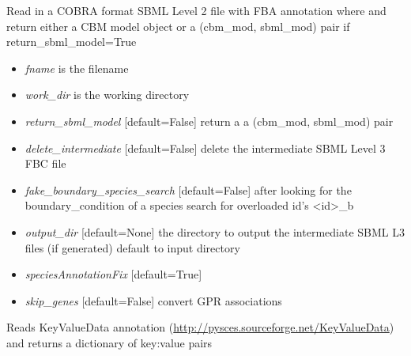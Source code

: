 \documentclass[a4paper,11pt,english]{sphinxmanual}
\begin{document}

\begin{fulllineitems}
\label{modules_doc:cbmpy.CBXML.sbml_readCOBRASBML}
Read in a COBRA format SBML Level 2 file with FBA annotation where and return either a CBM model object
or a (cbm\_mod, sbml\_mod) pair if return\_sbml\_model=True
\begin{itemize}
\item {} 
\emph{fname} is the filename

\item {} 
\emph{work\_dir} is the working directory

\item {} 
\emph{return\_sbml\_model} {[}default=False{]} return a a (cbm\_mod, sbml\_mod) pair

\item {} 
\emph{delete\_intermediate} {[}default=False{]} delete the intermediate SBML Level 3 FBC file

\item {} 
\emph{fake\_boundary\_species\_search} {[}default=False{]} after looking for the boundary\_condition of a species search for overloaded id's \textless{}id\textgreater{}\_b

\item {} 
\emph{output\_dir} {[}default=None{]} the directory to output the intermediate SBML L3 files (if generated) default to input directory

\item {} 
\emph{speciesAnnotationFix} {[}default=True{]}

\item {} 
\emph{skip\_genes} {[}default=False{]} convert GPR associations

\end{itemize}

\end{fulllineitems}


\begin{fulllineitems}
\label{modules_doc:cbmpy.CBXML.sbml_readKeyValueDataAnnotation}
Reads KeyValueData annotation (\url{http://pysces.sourceforge.net/KeyValueData}) and returns a dictionary of key:value pairs

\end{fulllineitems}
\end{document}

